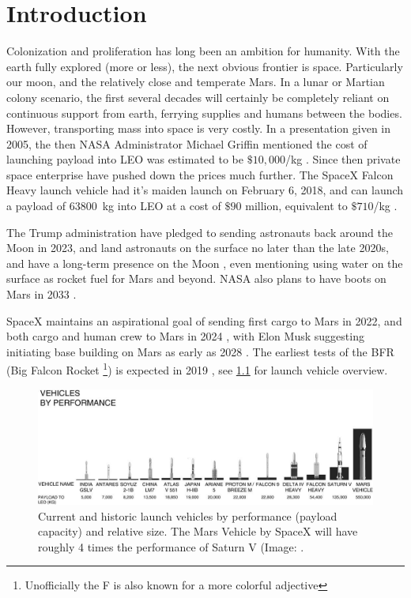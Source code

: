 
\chapter{Introduction}
Colonization and proliferation has long been an ambition for humanity. With the earth fully explored (more or less), the next obvious frontier is space. Particularly our moon, and the relatively close and temperate Mars. In a lunar or Martian colony scenario, the first several decades will certainly be completely reliant on continuous support from earth, ferrying supplies and humans between the bodies. However, transporting mass into space is very costly. In a presentation given in 2005, the then NASA Administrator Michael Griffin mentioned the cost of launching payload into LEO was estimated to be $\$10,000$/kg \cite[p.~344]{Rapp2016}. Since then private space enterprise have pushed down the prices much further. The SpaceX Falcon Heavy launch vehicle had it's maiden launch on February 6, 2018, and can launch a payload of \SI{63800}{\kg} into LEO at a cost of $\$90$ million, equivalent to $\$710$/kg \cite{SpaceX}.

The Trump administration have pledged to sending astronauts back around the Moon in 2023, and land astronauts on the surface no later than the late 2020s, and have a long-term presence on the Moon \cite{NASA2018}, even mentioning using water on the surface as rocket fuel for Mars and beyond. NASA also plans to have boots on Mars in 2033 \cite{Mack}.

SpaceX maintains an aspirational goal of sending first cargo to Mars in 2022, and both cargo and human crew to Mars in 2024 \cite{SpaceXa}, with Elon Musk suggesting initiating base building on Mars as early as 2028 \cite{Williams}. The earliest tests of the BFR (Big Falcon Rocket \footnote{Unofficially the F is also known for a more colorful adjective}) is expected in 2019 \cite{SpaceXa}, see \cref{fig:musk-launch-vehicles} for launch vehicle overview.

\begin{figure}[ht]
	\centering
	\includegraphics[width=0.90\linewidth]{fig/musk-launch-vehicles.jpg}
	\caption{Current and historic launch vehicles by performance (payload capacity) and relative size. The Mars Vehicle by SpaceX will have roughly 4 times the performance of Saturn V (Image: \cite{Musk}.}
	\label{fig:musk-launch-vehicles}
\end{figure}

